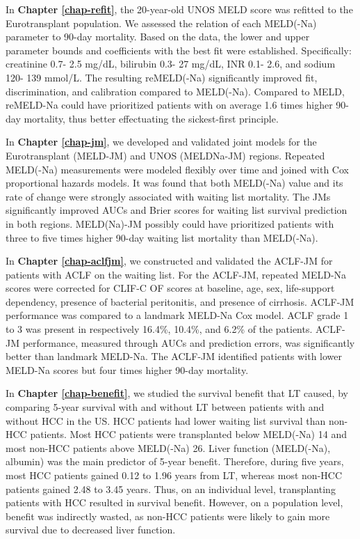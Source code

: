 \documentclass[11pt,english,]{book} %
\begin{document}
In \textbf{Chapter \ref{chap-refit}}, the 20-year-old UNOS MELD score was refitted to the Eurotransplant population. We assessed the relation of each MELD(-Na) parameter to 90-day mortality. Based on the data, the lower and upper parameter bounds and coefficients with the best fit were established. Specifically: creatinine 0.7- 2.5 mg/dL, bilirubin 0.3- 27 mg/dL, INR 0.1- 2.6, and sodium 120- 139 mmol/L. The resulting reMELD(-Na) significantly improved fit, discrimination, and calibration compared to MELD(-Na). Compared to MELD, reMELD-Na could have prioritized patients with on average 1.6 times higher 90-day mortality, thus better effectuating the sickest-first principle.

In \textbf{Chapter \ref{chap-jm}}, we developed and validated joint models for the Eurotransplant (MELD-JM) and UNOS (MELDNa-JM) regions. Repeated MELD(-Na) measurements were modeled flexibly over time and joined with Cox proportional hazards models. It was found that both MELD(-Na) value and its rate of change were strongly associated with waiting list mortality. The JMs significantly improved AUCs and Brier scores for waiting list survival prediction in both regions. MELD(Na)-JM possibly could have prioritized patients with three to five times higher 90-day waiting list mortality than MELD(-Na).

In \textbf{Chapter \ref{chap-aclfjm}}, we constructed and validated the ACLF-JM for patients with ACLF on the waiting list. For the ACLF-JM, repeated MELD-Na scores were corrected for CLIF-C OF scores at baseline, age, sex, life-support dependency, presence of bacterial peritonitis, and presence of cirrhosis. ACLF-JM performance was compared to a landmark MELD-Na Cox model. ACLF grade 1 to 3 was present in respectively 16.4\%, 10.4\%, and 6.2\% of the patients. ACLF-JM performance, measured through AUCs and prediction errors, was significantly better than landmark MELD-Na. The ACLF-JM identified patients with lower MELD-Na scores but four times higher 90-day mortality.

In \textbf{Chapter \ref{chap-benefit}}, we studied the survival benefit that LT caused, by comparing 5-year survival with and without LT between patients with and without HCC in the US. HCC patients had lower waiting list survival than non-HCC patients. Most HCC patients were transplanted below MELD(-Na) 14 and most non-HCC patients above MELD(-Na) 26. Liver function (MELD(-Na), albumin) was the main predictor of 5-year benefit. Therefore, during five years, most HCC patients gained 0.12 to 1.96 years from LT, whereas most non-HCC patients gained 2.48 to 3.45 years. Thus, on an individual level, transplanting patients with HCC resulted in survival benefit. However, on a population level, benefit was indirectly wasted, as non-HCC patients were likely to gain more survival due to decreased liver function.
\end{document}
